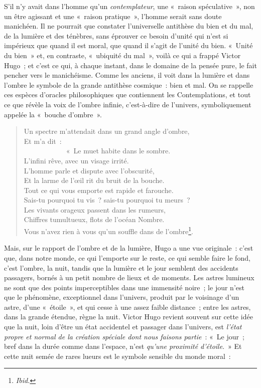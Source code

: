 \documentclass[french,twoside]{book} %
\begin{document}
\noindent S’il n’y avait dans l’homme qu’un \emph{contemplateur}, une « raison spéculative », non un être agissant et une « raison pratique », l’homme serait sans doute manichéen. Il ne pourrait que constater l’universelle antithèse du bien et du mal, de la lumière et des ténèbres, sans éprouver ce besoin d’unité qui n’est si impérieux que quand il est moral, que quand il s’agit de l’unité du bien. « Unité du bien » et, en contraste, « ubiquité du mal », voilà ce qui a frappé Victor Hugo ; et c’est ce qui, à chaque instant, dans le domaine de la pensée pure, le fait pencher vers le manichéisme. Comme les anciens, il voit dans la lumière et dans l’ombre le symbole de la grande antithèse cosmique : bien et mal. On se rappelle ces espèces d’oracles philosophiques que contiennent les Contemplations, et tout ce que révèle la voix de l’ombre infinie, c’est-à-dire de l’univers, symboliquement appelée la « bouche d’ombre ».\par


\begin{verse}
Un spectre m’attendait dans un grand angle d’ombre,\\
Et m’a dit :\\
            « Le muet habite dans le sombre.\\
L’infini rêve, avec un visage irrité.\\
L’homme parle et dispute avec l’obscurité,\\
Et la larme de l’œil rit du bruit de la bouche.\\
Tout ce qui vous emporte est rapide et farouche.\\
Sais-tu pourquoi tu vis ? sais-tu pourquoi tu meurs ?\\
Les vivants orageux passent dans les rumeurs,\\
Chiffres tumultueux, flots de l’océan Nombre.\\
Vous n’avez rien à vous qu’un souffle dans de l’ombre\footnote{\emph{Ibid.}}.\\
\end{verse}

\noindent Mais, sur le rapport de l’ombre et de la lumière, Hugo a une vue originale : c’est que, dans notre monde, ce qui l’emporte sur le reste, ce qui semble faire le fond, c’est l’ombre, la nuit, tandis que la lumière et le jour semblent des accidents passagers, bornés à un petit nombre de lieux et de moments. Les astres lumineux ne sont que des points imperceptibles dans une immensité noire ; le jour n’est que le phénomène, exceptionnel dans l’univers, produit par le voisinage d’un astre, d’une « étoile », et qui cesse à une assez faible distance ; entre les astres, dans la grande étendue, règne la nuit. Victor Hugo revient souvent sur cette idée que la nuit, loin d’être un état accidentel et passager dans l’univers, est \emph{l’état propre et normal de la création spéciale dont nous faisons partie} : « Le jour ; bref dans la durée comme dans l’espace, n’est \emph{qu’une proximité d’étoile}. » Et cette nuit semée de rares lueurs est le symbole sensible du monde moral :\par
\end{document}
